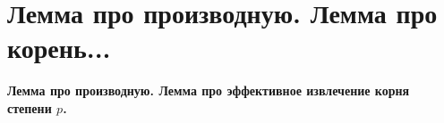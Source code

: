 \section{
 Лемма про производную. Лемма про корень... %
}

\textbf{Лемма про производную. Лемма про эффективное извлечение корня степени $p$.}

